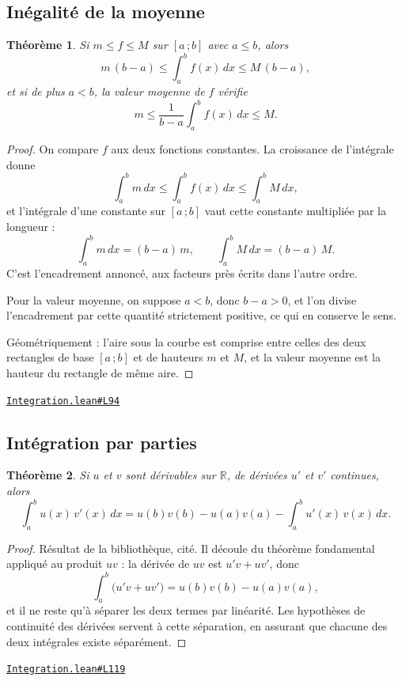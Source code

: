 \documentclass[11pt,a4paper]{article}
\theoremstyle{definition}
\theoremstyle{plain}
\newtheorem{theoreme}{Théorème}
\newcommand{\source}[2]{\par\smallskip\noindent\hfill{\footnotesize\href{#1}{\texttt{#2}}}\par\smallskip}
\begin{document}
\subsection{Inégalité de la moyenne}

\begin{theoreme}
Si $m \le f \le M$ sur $[a\,;b]$ avec $a \le b$, alors
\[ m\,(b - a) \le \int_a^b f(x)\,dx \le M\,(b - a) , \]
et si de plus $a < b$, la valeur moyenne de $f$ vérifie
\[ m \le \frac{1}{b - a}\int_a^b f(x)\,dx \le M . \]
\end{theoreme}

\begin{proof}
On compare $f$ aux deux fonctions constantes. La croissance de l'intégrale donne
\[ \int_a^b m\,dx \le \int_a^b f(x)\,dx \le \int_a^b M\,dx , \]
et l'intégrale d'une constante sur $[a\,;b]$ vaut cette constante multipliée par la
longueur :
\[ \int_a^b m\,dx = (b - a)\,m , \qquad \int_a^b M\,dx = (b - a)\,M . \]
C'est l'encadrement annoncé, aux facteurs près écrits dans l'autre ordre.

Pour la valeur moyenne, on suppose $a < b$, donc $b - a > 0$, et l'on divise l'encadrement
par cette quantité strictement positive, ce qui en conserve le sens.

\medskip\noindent
Géométriquement : l'aire sous la courbe est comprise entre celles des deux rectangles de
base $[a\,;b]$ et de hauteurs $m$ et $M$, et la valeur moyenne est la hauteur du rectangle
de même aire.
\end{proof}
\source{https://github.com/Commutator-IO/learn-lean/blob/main/cours/02-lycee/06-integration/Integration.lean\#L94}{Integration.lean\#L94}

\subsection{Intégration par parties}

\begin{theoreme}
Si $u$ et $v$ sont dérivables sur $\mathbb{R}$, de dérivées $u'$ et $v'$ continues, alors
\[ \int_a^b u(x)\,v'(x)\,dx
   = u(b)v(b) - u(a)v(a) - \int_a^b u'(x)\,v(x)\,dx . \]
\end{theoreme}

\begin{proof}
Résultat de la bibliothèque, cité. Il découle du théorème fondamental appliqué au produit
$uv$ : la dérivée de $uv$ est $u'v + uv'$, donc
\[ \int_a^b \bigl(u'v + uv'\bigr) = u(b)v(b) - u(a)v(a) , \]
et il ne reste qu'à séparer les deux termes par linéarité. Les hypothèses de continuité
des dérivées servent à cette séparation, en assurant que chacune des deux intégrales
existe séparément.
\end{proof}
\source{https://github.com/Commutator-IO/learn-lean/blob/main/cours/02-lycee/06-integration/Integration.lean\#L119}{Integration.lean\#L119}
\end{document}
